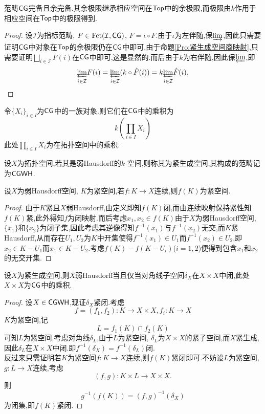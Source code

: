 \begin{theorem}
    范畴$\mathsf{CG}$完备且余完备.其余极限继承相应空间在$\mathsf{Top}$中的余极限,而极限由$k$作用于相应空间在$\mathsf{Top}$中的极限得到.
\end{theorem}
\begin{proof}
    设$\mathcal{I}$为指标范畴, $F \in \operatorname{Fct}(\mathcal{I},\mathsf{CG})$, $\hat{F} = \iota \circ F$.由于$\iota$为左伴随,保$\underrightarrow{\lim}$,因此只需要证明$\mathsf{CG}$中对象在$\mathsf{Top}$的余极限仍在$\mathsf{CG}$中即可,由于命题\ref{Pro:紧生成空间商映射},只需要证明$\bigsqcup_{i\in \mathcal{I}}F(i)$在$\mathsf{CG}$中即可,这是显然的.而后由于$k$为右伴随,因此保$\underleftarrow{\lim}$,即
    \[
    \underset{i\in \mathcal{I}}{\underleftarrow{\lim}} F(i) = \underset{i\in \mathcal{I}}{\underleftarrow{\lim}} (k\circ \hat{F}(i)) = k \underset{i\in \mathcal{I}}{\underleftarrow{\lim}} \hat{F}(i).
    \]
\end{proof}
\begin{corollary}
    令$\{X_i\}_{i\in I}$为$\mathsf{CG}$中的一族对象.则它们在$\mathsf{CG}$中的乘积为
    \[
     k(\prod_{i\in I}X_i)
    \]
    此处$\prod_{i\in I}X_i$为在拓扑空间中的乘积.
\end{corollary}
\begin{definition}[紧生成弱Hausdorff空间]\label{Def:紧生成弱Hausdorff空间}
    设$X$为拓扑空间,若其是弱Hausdorff的$k$-空间,则称其为紧生成空间,其构成的范畴记为$\mathsf{CGWH}$.
\end{definition}
\begin{proposition}
    设$X$为弱Hausdorff空间, $K$为紧空间,若$f : K \to X$连续,则$f(K)$为紧空间.
\end{proposition}
\begin{proof}
    由于$K$紧且$X$弱Hausdorff,由定义即知$f(K)$闭,而由连续映射保持紧性知$f(K)$紧,此外得知$f$为闭映射.而后考虑$x_1,x_2 \in f(K)$由于$X$为弱Hausdorff空间, $\{x_1\}$和$\{x_2\}$为闭子集,因此考虑其逆像得知$f^{-1}(x_1)$与$f^{-1}(x_2)$无交,而$K$紧Hausdorff,从而存在$U_1,U_2$为$K$中开集使得$f^{-1}(x_1)\in U_1$而$f^{-1}(x_2)\in U_2$,即$x_2\in K-U_1$而$x_1 \in K-U_2$.考虑$f(K) - f(K-U_i)$($i=1,2$)便得到包含$x_1$和$x_2$的无交开集.
\end{proof}
\begin{proposition}
    设$X$为紧生成空间,则$X$弱Hausdorff当且仅当对角线子空间$\delta_X$在$X\times X$中闭,此处$X \times X$为$\mathsf{CG}$中的乘积.
\end{proposition}
\begin{proof}
    设$X \in  \mathsf{CGWH}$,现证$\delta_X$紧闭.考虑
    \[
    f=(f_1,f_2) : K \to X\times X, f_i : K \to X
    \]
    $K$为紧空间,记
    \[
    L = f_1(K) \cap f_2(K)
    \]
    可知$L$为紧空间.考虑对角线$\delta_L$,由于$L$为紧空间, $\delta_L$为$X\times X$的紧子空间,而$X$紧生成,因此$\delta_L$在$X\times X$中闭.即$f^{-1}(\delta_X) = f^{-1}(\delta_L)$闭.\\
    反过来只需证明若$K$为紧空间$f: K\to X$连续,则$f(K)$紧闭即可.不妨设$L$为紧空间, $g: L \to X$连续,考虑
    \[
    (f,g): K \times L \to X\times X.
    \]
    则
    \[
    g^{-1}(f(K)) = (f,g)^{-1}(\delta_X)
    \]
    为闭集,即$f(K)$紧闭.
\end{proof}
